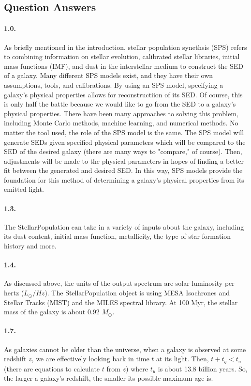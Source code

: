 \documentclass{article}
\begin{document}
\subsection*{Question Answers}

\paragraph{1.0.} As briefly mentioned in the introduction, stellar population synethsis (SPS) refers to
combining information on stellar evolution, calibrated stellar libraries, initial mass functions
(IMF), and dust in the interstellar medium to construct the SED of a galaxy. Many different SPS models exist,
and they  have their own assumptions, tools, and calibrations. By using an SPS model, specifying a
galaxy's physical properties allows for reconstructiion of its SED. Of course, this is only half the battle
because we would like to go from the SED to a galaxy's physical properties. There have been many approaches to
solving this problem, including Monte Carlo methods, machine learning, and numerical methods. No matter
the tool used, the role of the SPS model is the same. The SPS model will generate SEDs given specified physical
parameters which will be compared to the SED of the desired galaxy (there are many ways to "compare," of course).
Then, adjustments will be made to the physical parameters in hopes of finding a better fit between the generated
and desired SED. In this way, SPS models provide the foundation for this method of determining a galaxy's
physical properties from its emitted light.

\paragraph{1.3.} The StellarPopulation can take in a variety of inputs about the galaxy, including its dust
content, initial mass function, metallicity, the type of star formation history and more.

\paragraph{1.4.} As discussed above, the units of the output spectrum are solar luminosity per hertz
($L_\odot/Hz$). The StellarPopulation object is using MESA Isochrones and Stellar Tracks (MIST) and
the MILES spectral library. At 100 Myr, the stellar mass of the galaxy is about 0.92 $M_\odot$.

\paragraph{1.7.} As galaxies cannot be older than the universe, when a galaxy is observed at some redshift
$z$, we are effectively looking back in time $t$ at its light. Then, $t + t_g < t_u$ (there are equations
to calculate $t$ from $z$) where $t_u$ is about 13.8 billion years. So, the larger a galaxy's redshift,
the smaller its possible maximum age is.
\end{document}
